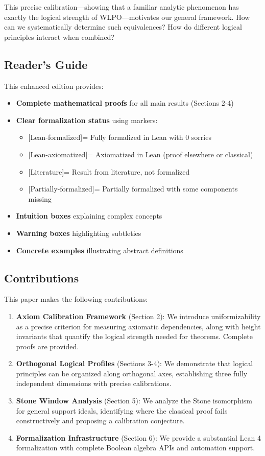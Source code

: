\documentclass[11pt]{article}
\theoremstyle{plain}
\theoremstyle{definition}
\newcommand{\leanok}{\textsf{\textcolor{green!70!black}{[Lean-formalized]}}}
\newcommand{\leanaxiom}{\textsf{\textcolor{orange!80!black}{[Lean-axiomatized]}}}
\newcommand{\leancited}{\textsf{\textcolor{blue!70!black}{[Literature]}}}
\newcommand{\leanpartial}{\textsf{\textcolor{purple!70!black}{[Partially-formalized]}}}
\begin{document}
This precise calibration—showing that a familiar analytic phenomenon has exactly the logical strength of WLPO—motivates our general framework. How can we systematically determine such equivalences? How do different logical principles interact when combined?

\subsection{Reader's Guide}

This enhanced edition provides:
\begin{itemize}
\item \textbf{Complete mathematical proofs} for all main results (Sections 2-4)
\item \textbf{Clear formalization status} using markers:
  \begin{itemize}
  \item \leanok = Fully formalized in Lean with 0 sorries
  \item \leanaxiom = Axiomatized in Lean (proof elsewhere or classical)
  \item \leancited = Result from literature, not formalized
  \item \leanpartial = Partially formalized with some components missing
  \end{itemize}
\item \textbf{Intuition boxes} explaining complex concepts
\item \textbf{Warning boxes} highlighting subtleties
\item \textbf{Concrete examples} illustrating abstract definitions
\end{itemize}

\subsection{Contributions}

This paper makes the following contributions:

\begin{enumerate}
\item \textbf{Axiom Calibration Framework} (Section 2): We introduce uniformizability as a precise criterion for measuring axiomatic dependencies, along with height invariants that quantify the logical strength needed for theorems. Complete proofs are provided.

\item \textbf{Orthogonal Logical Profiles} (Sections 3-4): We demonstrate that logical principles can be organized along orthogonal axes, establishing three fully independent dimensions with precise calibrations.

\item \textbf{Stone Window Analysis} (Section 5): We analyze the Stone isomorphism for general support ideals, identifying where the classical proof fails constructively and proposing a calibration conjecture.

\item \textbf{Formalization Infrastructure} (Section 6): We provide a substantial Lean 4 formalization with complete Boolean algebra APIs and automation support.
\end{enumerate}
\end{document}
